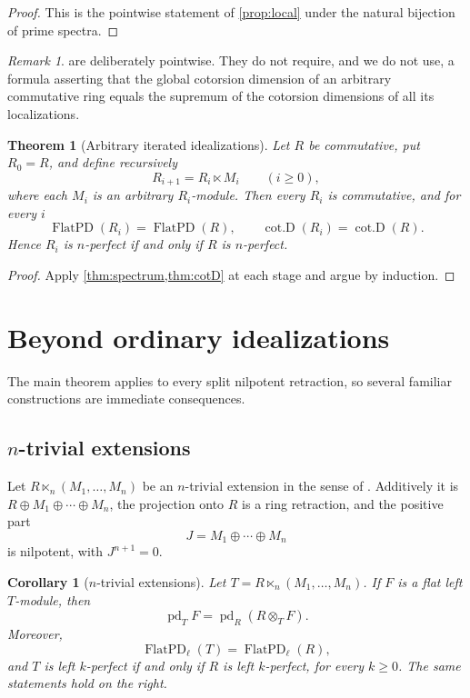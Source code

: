 \documentclass[11pt,reqno]{amsart}
\newcommand{\pd}{\operatorname{pd}}
\newcommand{\cotD}{\operatorname{cot.D}}
\newcommand{\FlatPD}{\operatorname{FlatPD}}
\theoremstyle{plain}
\newtheorem{theorem}{Theorem}[section]
\newtheorem{corollary}[corollary]{Corollary}
\theoremstyle{definition}
\theoremstyle{remark}
\newtheorem{remark}[remark]{Remark}
\begin{document}
\begin{proof}
This is the pointwise statement of \cref{prop:local} under the natural bijection of
prime spectra.
\end{proof}

\begin{remark}\label{rem:localglobal-warning}
 are deliberately pointwise.  They do not require, and
we do not use, a formula asserting that the global cotorsion dimension of an
arbitrary commutative ring equals the supremum of the cotorsion dimensions of all
its localizations.
\end{remark}

\begin{theorem}[Arbitrary iterated idealizations]\label{thm:iteration}
Let $R$ be commutative, put $R_0=R$, and define recursively
\[
  R_{i+1}=R_i\ltimes M_i\qquad(i\ge0),
\]
where each $M_i$ is an arbitrary $R_i$-module.  Then every $R_i$ is commutative, and for every $i$
\[
  \FlatPD(R_i)=\FlatPD(R),
  \qquad
  \cotD(R_i)=\cotD(R).
\]
Hence $R_i$ is $n$-perfect if and only if $R$ is $n$-perfect.
\end{theorem}

\begin{proof}
Apply \cref{thm:spectrum,thm:cotD} at each stage and argue by induction.
\end{proof}

\section{Beyond ordinary idealizations}

The main theorem applies to every split nilpotent retraction, so several familiar
constructions are immediate consequences.

\subsection{\texorpdfstring{$n$}{n}-trivial extensions}

Let $R\ltimes_n(M_1,\dots,M_n)$ be an $n$-trivial extension in the sense of
\cite{AndersonEtAl2017,BenkhadraBennisGarcia2020}.  Additively it is
$R\oplus M_1\oplus\cdots\oplus M_n$, the projection onto $R$ is a ring
retraction, and the positive part
\[
  J=M_1\oplus\cdots\oplus M_n
\]
is nilpotent, with $J^{n+1}=0$.

\begin{corollary}[$n$-trivial extensions]\label{cor:ntrivial}
Let $T=R\ltimes_n(M_1,\dots,M_n)$.  If $F$ is a flat left $T$-module, then
\[
  \pd_TF=\pd_R(R\otimes_TF).
\]
Moreover,
\[
  \FlatPD_{\ell}(T)=\FlatPD_{\ell}(R),
\]
and $T$ is left $k$-perfect if and only if $R$ is left $k$-perfect, for every
$k\ge0$.  The same statements hold on the right.
\end{corollary}
\end{document}
